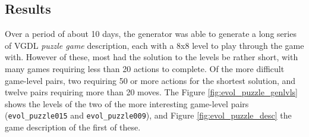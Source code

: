 \documentclass[a4paper,titlepage,final]{report}
\begin{document}


\subsection{Results} 
Over a period of about 10 days, the generator was able to generate a long series of VGDL \textit{puzzle game} description, each with a 8x8 level to play through the game with.
However of these, most had the solution to the levels be rather short, with many games requiring less than 20 actions to complete.
Of the more difficult game-level pairs, two requiring 50 or more actions for the shortest solution, and twelve pairs requiring more than 20 moves.
The Figure \ref{fig:evol_puzzle_genlvls} shows the levels of the two of the more interesting game-level pairs (\texttt{evol_puzzle015} and \texttt{evol_puzzle009}), and Figure \ref{fig:evol_puzzle_desc} the game description of the first of these.
\end{document}
